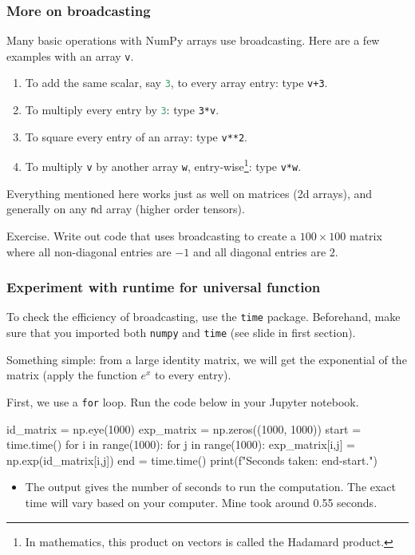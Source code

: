 \documentclass{beamer}
\newenvironment{codeblock}
    {\hfill\begin{beamerboxesrounded}[lower=codecol, width=0.8\textwidth]
    \medskip

    }
    { 
    \end{beamerboxesrounded}\hfill
    }
\theoremstyle{example}
\newcommand{\ct}[1]{\lstinline[language=Python]!#1!}
\newcommand{\ttt}[1]{{\small\texttt{#1}}}
\begin{document}
\begin{frame}
\frametitle{More on broadcasting}
Many basic operations with NumPy arrays use broadcasting. Here are a few examples with an array \ttt{v}.
\begin{enumerate}
    \item To add the same scalar, say \ct{3}, to every array entry: type \ttt{v+3}.
    \item To multiply every entry by \ct{3}: type \ttt{3*v}.
    \item To square every entry of an array: type \ttt{v**2}.
    \item To multiply \ttt{v} by another array \ttt{w}, entry-wise\footnote{In mathematics, this product on vectors is called the Hadamard product.}: type \ttt{v*w}.
\end{enumerate}

Everything mentioned here works just as well on matrices (2d arrays), and generally on any \ttt{n}d array (higher order tensors).

\vspace*{12pt}
Exercise. \newline
Write out code that uses broadcasting to create a $100\times 100$ matrix where all non-diagonal entries are $-1$ and all diagonal entries are $2$.
\end{frame}

\begin{frame}[fragile]
\frametitle{Experiment with runtime for universal function}
To check the efficiency of broadcasting, use the \ttt{time} package. Beforehand, make sure that you imported both \ttt{numpy} and \ttt{time} (see slide in first section).

Something simple: from a large identity matrix, we will get the exponential of the matrix (apply the function $e^x$ to every entry).

First, we use a \ttt{for} loop. Run the code below in your Jupyter notebook.

\begin{codeblock}

\begin{python}
id_matrix = np.eye(1000)
exp_matrix = np.zeros((1000, 1000))
start = time.time()
for i in range(1000):
    for j in range(1000):
        exp_matrix[i,j] = np.exp(id_matrix[i,j])
end = time.time()
print(f"Seconds taken: {end-start}.")
\end{python}

\end{codeblock}

\vspace*{12pt}
\begin{itemize}
    \item[] The output gives the number of seconds to run the computation. The exact time will vary based on your computer. Mine took around 0.55 seconds.
\end{itemize}
\end{frame}
\end{document}
